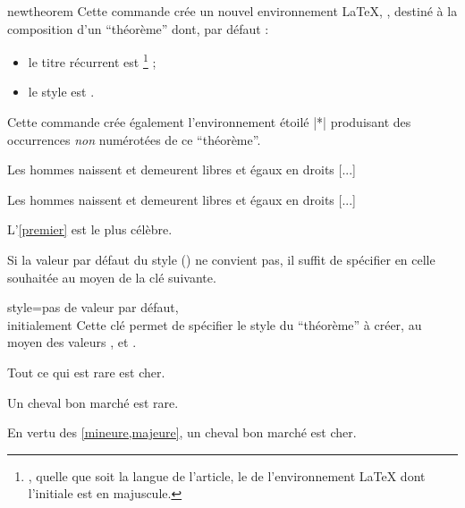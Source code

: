 \documentclass[french,nolocaltoc]{nwejmart}
\newtheorem{article}
\newtheorem[style=definition]{fait}
\newtheorem[title=expérience]{experience}
\newtheorem[title-plural=anneaux]{anneau}
\newtheorem[title=idéal,title-plural=idéaux]{ideal}
\begin{document}
\begin{docCommand}{newtheorem}{}
  Cette commande crée un nouvel environnement \LaTeX{}, , destiné à la
  composition d'un \enquote{théorème} dont, par défaut :
  \begin{itemize}
  \item le titre récurrent est \footnote{\Ie*{}, quelle que soit la
      langue de l'article, le  de l'environnement \LaTeX{} dont
      l'initiale est en majuscule.} ;
  \item le style est .
  \end{itemize}
  Cette commande crée également l'environnement étoilé |*| produisant
  des occurrences \emph{non} numérotées de ce \enquote{théorème}.

\begin{bodycode}[listing and text,listing options={deletekeywords={[2]article,label}}]
\begin{article*}
Les hommes naissent et demeurent libres et égaux en droits [...]
\end{article*}
\begin{article}\label{premier}
Les hommes naissent et demeurent libres et égaux en droits [...]
\end{article}
L'\vref{premier} est le plus célèbre.
\end{bodycode}

  Si la valeur par défaut du style () ne convient pas, il
  suffit de spécifier en  celle souhaitée au moyen de la clé
   suivante.
  \begin{docKey}{style}{=\textbar{}\textbar{}}{pas
      de valeur par défaut,\\initialement {}}
    Cette clé permet de spécifier le style du \enquote{théorème} à créer, au
    moyen des valeurs ,  et
    .
  \end{docKey}
\begin{bodycode}[listing and text,listing options={deletekeywords={[2]label}}]
\begin{fait}\label{majeure}
Tout ce qui est rare est cher.
\end{fait}
\begin{fait}\label{mineure}
Un cheval bon marché est rare.
\end{fait}
En vertu des \cref{mineure,majeure}, un cheval bon marché est
cher.
\end{bodycode}


\end{docCommand}
\end{document}
